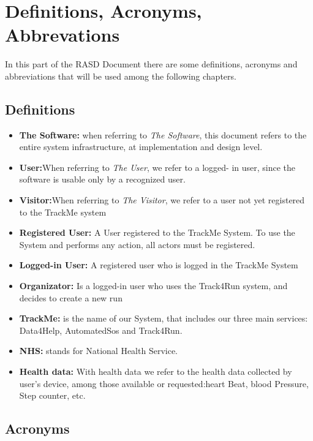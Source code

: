 \section{Definitions, Acronyms, Abbrevations}
In this part of the RASD Document there are some definitions, acronyms and abbreviations that will be used among the following chapters.
\subsection{Definitions}
\begin{itemize}
	\item \textbf{The Software:} when referring to \emph{The Software}, this document refers to the entire system infrastructure, at implementation and design level.

\item \textbf{User:}When referring to \emph{The User}, we refer to a logged- in user, since the software is usable only by a recognized user. 

\item \textbf{Visitor:}When referring to \emph{The Visitor}, we refer to a user not yet registered to the TrackMe system

\item \textbf{Registered User:} A User registered to the TrackMe System. To use the System and performs any action, all actors must be registered. 

\item\textbf{Logged-in User:} A registered user who is logged in the TrackMe System

\item\textbf{Organizator:} Is a logged-in  user who uses the Track4Run system, and decides to create a new run

\item\textbf{TrackMe:}
is the name of our System, that  includes our three main services: Data4Help, AutomatedSos and Track4Run.

\item\textbf{NHS:} stands for National Health Service.
\item\textbf{Health data:} With health data we refer to the health data collected by user's device, among those available or requested:heart Beat, blood Pressure, Step counter, etc. 



	
	\end{itemize}
\subsection{Acronyms}

